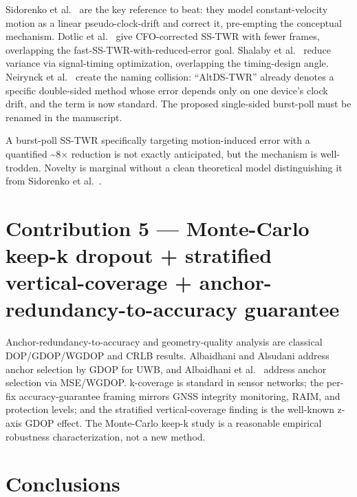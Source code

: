 
Sidorenko et al.\ \cite{sidorenko2020error} are the key reference to beat: they model constant-velocity motion as a linear pseudo-clock-drift and correct it, pre-empting the conceptual mechanism. Dotlic et al.\ \cite{dotlic2018ranging} give CFO-corrected SS-TWR with fewer frames, overlapping the fast-SS-TWR-with-reduced-error goal. Shalaby et al.\ \cite{shalaby2024reducing} reduce variance via signal-timing optimization, overlapping the timing-design angle. Neirynck et al.\ \cite{neirynck2016alternative} create the naming collision: ``AltDS-TWR'' already denotes a specific double-sided method whose error depends only on one device's clock drift, and the term is now standard. The proposed single-sided burst-poll must be renamed in the manuscript.

A burst-poll SS-TWR specifically targeting motion-induced error with a quantified \textasciitilde{}8$\times$ reduction is not exactly anticipated, but the mechanism is well-trodden. Novelty is marginal without a clean theoretical model distinguishing it from Sidorenko et al.\ \cite{sidorenko2020error}.

\section{Contribution 5 --- Monte-Carlo keep-k dropout + stratified vertical-coverage + anchor-redundancy-to-accuracy guarantee}


\begin{sloppypar}
Anchor-redundancy-to-accuracy and geometry-quality analysis are classical DOP/GDOP/WGDOP\allowbreak{} and CRLB results. Albaidhani and Alsudani \cite{albaidhani2021anchor} address anchor selection by GDOP for UWB, and Albaidhani et al.\ \cite{albaidhani2019anchor} address anchor selection via MSE/WGDOP. k-coverage is standard in sensor networks; the per-fix accuracy-guarantee framing mirrors GNSS integrity monitoring, RAIM, and protection levels; and the stratified vertical-coverage finding is the well-known z-axis GDOP effect. The Monte-Carlo keep-k study is a reasonable empirical robustness characterization, not a new method.
\end{sloppypar}

\section{Conclusions}

